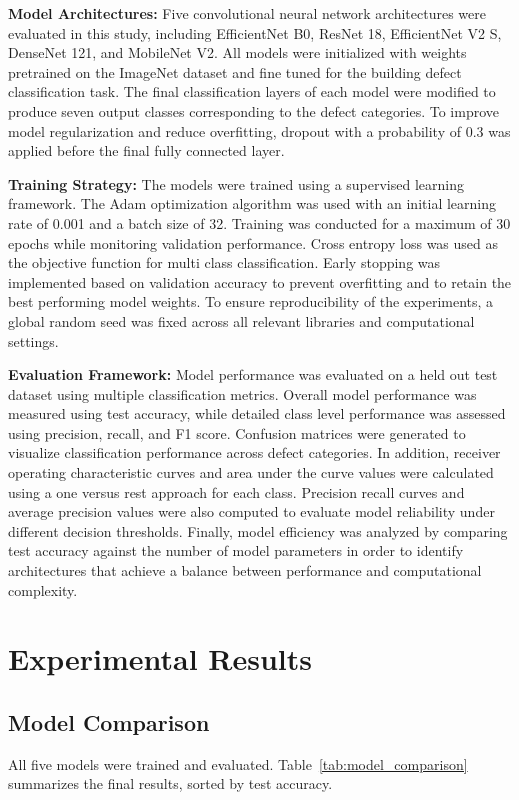 \documentclass[conference]{IEEEtran}
\begin{document}
\textbf{Model Architectures:}
Five convolutional neural network architectures were evaluated in this study, including EfficientNet B0, ResNet 18, EfficientNet V2 S, DenseNet 121, and MobileNet V2. All models were initialized with weights pretrained on the ImageNet dataset and fine tuned for the building defect classification task. The final classification layers of each model were modified to produce seven output classes corresponding to the defect categories. To improve model regularization and reduce overfitting, dropout with a probability of 0.3 was applied before the final fully connected layer.

\textbf{Training Strategy:}
The models were trained using a supervised learning framework. The Adam optimization algorithm was used with an initial learning rate of 0.001 and a batch size of 32. Training was conducted for a maximum of 30 epochs while monitoring validation performance. Cross entropy loss was used as the objective function for multi class classification. Early stopping was implemented based on validation accuracy to prevent overfitting and to retain the best performing model weights. To ensure reproducibility of the experiments, a global random seed was fixed across all relevant libraries and computational settings.

\textbf{Evaluation Framework:}
Model performance was evaluated on a held out test dataset using multiple classification metrics. Overall model performance was measured using test accuracy, while detailed class level performance was assessed using precision, recall, and F1 score. Confusion matrices were generated to visualize classification performance across defect categories. In addition, receiver operating characteristic curves and area under the curve values were calculated using a one versus rest approach for each class. Precision recall curves and average precision values were also computed to evaluate model reliability under different decision thresholds. Finally, model efficiency was analyzed by comparing test accuracy against the number of model parameters in order to identify architectures that achieve a balance between performance and computational complexity.






\section{Experimental Results}

\subsection{Model Comparison}
All five models were trained and evaluated. Table~\ref{tab:model_comparison} summarizes the final results, sorted by test accuracy.
\end{document}
